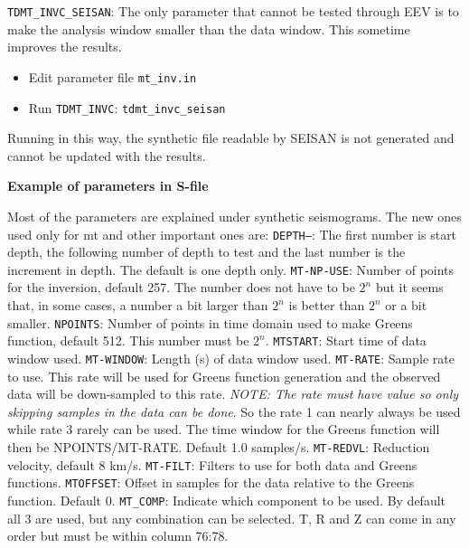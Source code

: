 \texttt{TDMT\_INVC\_SEISAN}: The only parameter that cannot be tested through EEV is to make the analysis window smaller than the data window. This sometime improves the results.

\begin{itemize}
\item 
Edit parameter file \texttt{mt\_inv.in}
\item 
Run \texttt{TDMT\_INVC}: \texttt{tdmt\_invc\_seisan}
\end{itemize}

Running in this way, the synthetic file readable by SEISAN is not generated and cannot be updated with the results.

\textbf{Example of parameters in S-file}



Most of the parameters are explained under synthetic seismograms. The new ones used only for mt  and other important ones are:\newline
\texttt{DEPTH--}: The first number is start depth, the following number of depth to test and the last number is the increment in depth. The default is one depth only.
\texttt{MT-NP-USE}: Number of points for the inversion, default 257. The number does not have to be $2^n$ but it seems that, in some cases, a number a bit larger than $2^n$ is better than $2^n$ or a bit smaller.\newline
\texttt{NPOINTS}: Number of points in time domain used to make Greens function, default 512. This number must be $2^n$.\newline
\texttt{MTSTART}: Start time of data window used.
\texttt{MT-WINDOW}: Length (s) of data window used.
\texttt{MT-RATE}: Sample rate to use. This rate will be used for Greens function generation and the observed data will be down-sampled to this rate. \textit{NOTE: The rate must have value so only skipping samples in the data can be done}. So the rate 1 can nearly always be used while rate 3 rarely can be used. The time window for the Greens function will then be NPOINTS/MT-RATE. Default 1.0 samples/s.\newline
\texttt{MT-REDVL}: Reduction velocity, default 8 km/s.\newline
\texttt{MT-FILT}: Filters to use for both data and Greens functions. \newline
\texttt{MTOFFSET}: Offset in samples for the data relative to the Greens function. Default 0.\newline
\texttt{MT\_COMP}: Indicate which component to be used. By default all 3 are used, but any combination can be selected. T, R and Z can come in any order but must be within column 76:78.\newline

